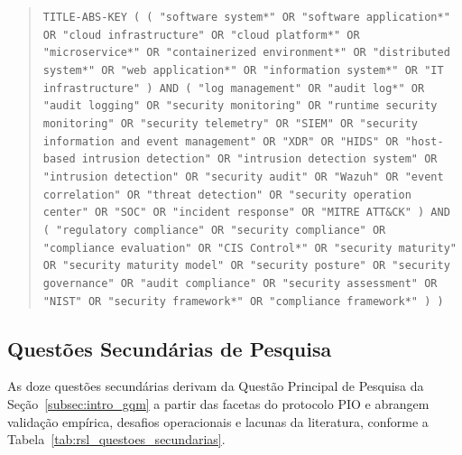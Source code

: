 \begin{quote}
\footnotesize
\sloppy
\texttt{TITLE-ABS-KEY ( ( "software system*" OR "software application*" OR "cloud infrastructure" OR "cloud platform*" OR "microservice*" OR "containerized environment*" OR "distributed system*" OR "web application*" OR "information system*" OR "IT infrastructure" ) AND ( "log management" OR "audit log*" OR "audit logging" OR "security monitoring" OR "runtime security monitoring" OR "security telemetry" OR "SIEM" OR "security information and event management" OR "XDR" OR "HIDS" OR "host-based intrusion detection" OR "intrusion detection system" OR "intrusion detection" OR "security audit" OR "Wazuh" OR "event correlation" OR "threat detection" OR "security operation center" OR "SOC" OR "incident response" OR "MITRE ATT\&CK" ) AND ( "regulatory compliance" OR "security compliance" OR "compliance evaluation" OR "CIS Control*" OR "security maturity" OR "security maturity model" OR "security posture" OR "security governance" OR "audit compliance" OR "security assessment" OR "NIST" OR "security framework*" OR "compliance framework*" ) )}
\end{quote}

\FloatBarrier

\subsection{Questões Secundárias de Pesquisa}
\label{subsec:rsl_questoes_secundarias}

As doze questões secundárias derivam da Questão Principal de Pesquisa da Seção~\ref{subsec:intro_gqm} a partir das facetas do protocolo PIO e abrangem validação empírica, desafios operacionais e lacunas da literatura, conforme a Tabela~\ref{tab:rsl_questoes_secundarias}.

